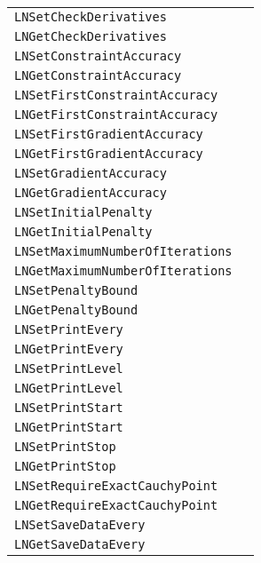 \documentclass[12pt]{article}
\begin{document}
\begin{center}
\begin{tabular}{ll}
\tt LNSetCheckDerivatives&\pageref{Subroutine:LNSetCheckDerivatives}\\
\tt LNGetCheckDerivatives&\pageref{Subroutine:LNGetCheckDerivatives}\\
\tt LNSetConstraintAccuracy&\pageref{Subroutine:LNSetConstraintAccuracy}\\
\tt LNGetConstraintAccuracy&\pageref{Subroutine:LNGetConstraintAccuracy}\\
\tt LNSetFirstConstraintAccuracy&\pageref{Subroutine:LNSetFirstConstraintAccuracy}\\
\tt LNGetFirstConstraintAccuracy&\pageref{Subroutine:LNGetFirstConstraintAccuracy}\\
\tt LNSetFirstGradientAccuracy&\pageref{Subroutine:LNSetFirstGradientAccuracy}\\
\tt LNGetFirstGradientAccuracy&\pageref{Subroutine:LNGetFirstGradientAccuracy}\\
\tt LNSetGradientAccuracy&\pageref{Subroutine:LNSetGradientAccuracy}\\
\tt LNGetGradientAccuracy&\pageref{Subroutine:LNGetGradientAccuracy}\\
\tt LNSetInitialPenalty&\pageref{Subroutine:LNSetInitialPenalty}\\
\tt LNGetInitialPenalty&\pageref{Subroutine:LNGetInitialPenalty}\\
\tt LNSetMaximumNumberOfIterations&\pageref{Subroutine:LNSetMaximumNumberOfIterations}\\
\tt LNGetMaximumNumberOfIterations&\pageref{Subroutine:LNGetMaximumNumberOfIterations}\\
\tt LNSetPenaltyBound&\pageref{Subroutine:LNSetPenaltyBound}\\
\tt LNGetPenaltyBound&\pageref{Subroutine:LNGetPenaltyBound}\\
\tt LNSetPrintEvery&\pageref{Subroutine:LNSetPrintEvery}\\
\tt LNGetPrintEvery&\pageref{Subroutine:LNGetPrintEvery}\\
\tt LNSetPrintLevel&\pageref{Subroutine:LNSetPrintLevel}\\
\tt LNGetPrintLevel&\pageref{Subroutine:LNGetPrintLevel}\\
\tt LNSetPrintStart&\pageref{Subroutine:LNSetPrintStart}\\
\tt LNGetPrintStart&\pageref{Subroutine:LNGetPrintStart}\\
\tt LNSetPrintStop&\pageref{Subroutine:LNSetPrintStop}\\
\tt LNGetPrintStop&\pageref{Subroutine:LNGetPrintStop}\\
\tt LNSetRequireExactCauchyPoint&\pageref{Subroutine:LNSetRequireExactCauchyPoint}\\
\tt LNGetRequireExactCauchyPoint&\pageref{Subroutine:LNGetRequireExactCauchyPoint}\\
\tt LNSetSaveDataEvery&\pageref{Subroutine:LNSetSaveDataEvery}\\
\tt LNGetSaveDataEvery&\pageref{Subroutine:LNGetSaveDataEvery}\\
\end{tabular}
\end{center}
\end{document}
